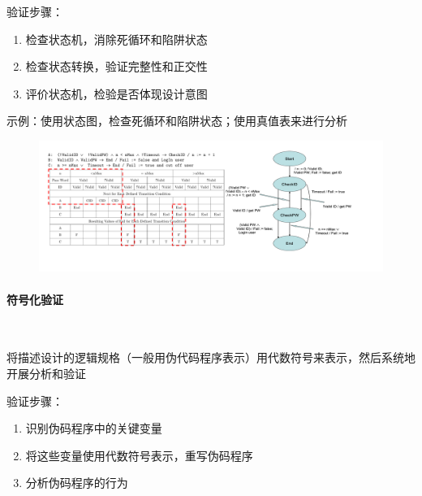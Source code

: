 验证步骤：
\vspace{-0.8em}
\begin{multicols}{2}
    \begin{enumerate}[label=\arabic*.]
        \item 检查状态机，消除死循环和陷阱状态
        \item 检查状态转换，验证完整性和正交性
        \item 评价状态机，检验是否体现设计意图
    \end{enumerate}
\end{multicols}
\vspace{-1em}

示例：使用状态图，检查死循环和陷阱状态；使用真值表来进行分析
\begin{figure}[H]
    \vspace{-0.5em}
	\centering
	\includegraphics[width=\textwidth]{images/状态机示例.pdf}
    \vspace{-3em}
\end{figure}

\paragraph{符号化验证}~{} \par
将描述设计的逻辑规格（一般用伪代码程序表示）用代数符号来表示，然后系统地开展分析和验证

验证步骤：
\vspace{-0.8em}
\begin{multicols}{2}
    \begin{enumerate}[label=\arabic*.]
        \item 识别伪码程序中的关键变量
        \item 将这些变量使用代数符号表示，重写伪码程序
        \item 分析伪码程序的行为
    \end{enumerate}
\end{multicols}
\vspace{-1em}


